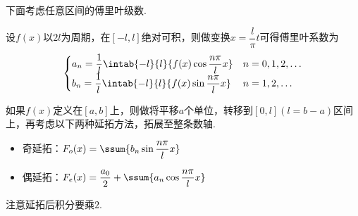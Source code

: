 \par 下面考虑任意区间的傅里叶级数.
\begin{definition}[任意区间的傅里叶级数]
设$f(x)$以$2l$为周期，在$[-l,l]$绝对可积，则做变换$x=\dfrac{l}{\pi}t$可得傅里叶系数为
\[\begin{cases}
a_n=\dfrac{1}{l}\intab{-l}{l}{f(x)\cos \dfrac{n\pi}{l}x} & n=0,1,2,\ldots\\
b_n=\dfrac{1}{l}\intab{-l}{l}{f(x)\sin \dfrac{n\pi}{l}x} & n=1,2,\ldots
\end{cases}\]
\end{definition}
\par 如果$f(x)$定义在$[a,b]$上，则做将平移$a$个单位，转移到$[0,l](l=b-a)$区间上，再考虑以下两种延拓方法，拓展至整条数轴.
\begin{itemize}
	\item 奇延拓：$F_o(x)=\ssum{b_n\sin\dfrac{n\pi}{l}x}$
	\item 偶延拓：$F_e(x)=\dfrac{a_0}{2}+\ssum{a_n\cos\dfrac{n\pi}{l}x}$
\end{itemize}
\par 注意延拓后积分要乘$2$.

